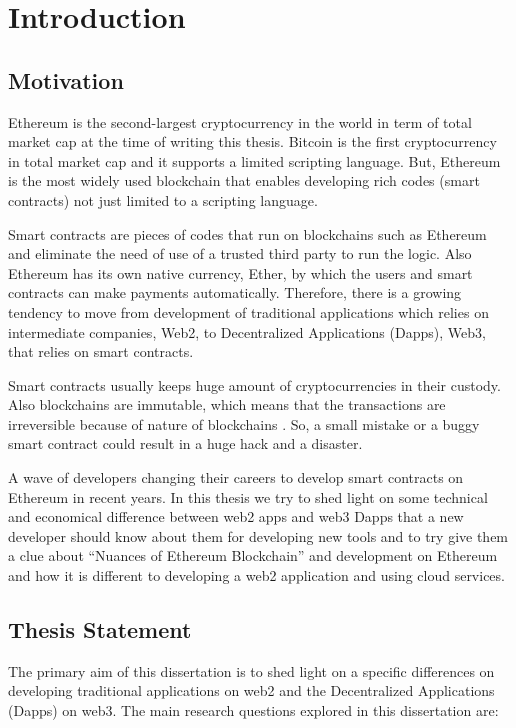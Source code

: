 \chapter{Introduction}


\section{Motivation}
Ethereum is the second-largest cryptocurrency in the world in term of total market cap at the time of writing this thesis. Bitcoin is the first cryptocurrency in total market cap and it supports a limited scripting language. But, Ethereum is the most widely used blockchain that enables developing rich codes (smart contracts) not just limited to a scripting language.

Smart contracts are pieces of codes that run on blockchains such as Ethereum and eliminate the need of use of a trusted third party to run the logic. Also Ethereum has its own native currency, Ether, by which the users and smart contracts can make payments automatically.
Therefore, there is a growing tendency to move from development of traditional applications which relies on intermediate companies, Web2, to Decentralized Applications (Dapps), Web3, that relies on smart contracts. 

Smart contracts usually keeps huge amount of cryptocurrencies in their custody. Also blockchains are immutable, which means that the transactions are irreversible because of nature of blockchains . So, a small mistake or a buggy smart contract could result in a huge hack and a disaster.


A wave of developers changing their careers to develop smart contracts on Ethereum in recent years. In this thesis we try to shed light on some technical and economical difference between web2 apps and web3 Dapps that a new developer should know about them for developing new tools and to try give them a clue about ``Nuances of Ethereum Blockchain'' and development on Ethereum and how it is different to developing a web2 application and using cloud services.  


\section{Thesis Statement}
The primary aim of this dissertation is to shed light on a specific differences on developing traditional applications on web2 and the Decentralized Applications (Dapps) on web3. The main research questions explored in this dissertation are:

